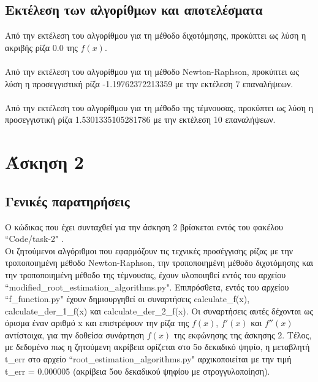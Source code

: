 \documentclass[a4paper,11pt]{article}
\newcommand{\lt}{\latintext}
\begin{document}
\subsection*{Εκτέλεση των αλγορίθμων και αποτελέσματα}
Από την εκτέλεση του αλγορίθμου για τη μέθοδο διχοτόμησης, προκύπτει ως λύση η ακριβής ρίζα 0.0 της {$f(x)$}.\\
\\Από την εκτέλεση του αλγορίθμου για τη μέθοδο {\lt Newton-Raphson}, προκύπτει ως λύση η προσεγγιστική ρίζα -1.19762372213359 με την εκτέλεση 7 επαναλήψεων.\\
\\Από την εκτέλεση του αλγορίθμου για τη μέθοδο της τέμνουσας, προκύπτει ως λύση η προσεγγιστική ρίζα 1.5301335105281786 με την εκτέλεση 10 επαναλήψεων.

\section*{Άσκηση 2}
\subsection*{Γενικές παρατηρήσεις}
Ο κώδικας που έχει συνταχθεί για την άσκηση 2 βρίσκεται εντός του φακέλου {\lt ``Code/task-2" }.\\
Οι ζητούμενοι αλγόριθμοι που εφαρμόζουν τις τεχνικές προσέγγισης ρίζας με την τροποποιημένη μέθοδο {\lt Newton-Raphson}, την τροποποιημένη μέθοδο διχοτόμησης και την τροποποιημένη μέθοδο της τέμνουσας, έχουν 		υλοποιηθεί εντός του αρχείου {\lt ``modified\_root\_estimation\_algorithms.py"}.
Επιπρόσθετα, εντός του αρχείου {\lt ``f\_function.py"} έχουν δημιουργηθεί οι συναρτήσεις {\lt calculate\_f(x)}, {\lt calculate\_der\_1\_f(x)} και {\lt calculate\_der\_2\_f(x)}. Οι συναρτήσεις αυτές δέχονται ως όρισμα έναν
αριθμό {\lt x} και επιστρέφουν την ρίζα της {\lt $f(x)$}, {\lt $f'(x)$} και {\lt $f''(x)$} αντίστοιχα, για την δοθείσα συνάρτηση {\lt $f(x)$} της εκφώνησης της άσκησης 2.
Τέλος, με δεδομένο πως η ζητούμενη ακρίβεια ορίζεται στο 5ο δεκαδικό ψηφίο, η μεταβλητή {\lt t\_err}  στο αρχείο {\lt ``root\_estimation\_algorithms.py"} αρχικοποιείται με την τιμή {\lt t\_err} = 0.000005 (ακρίβεια 5ου 	δεκαδικού ψηφίου με στρογγυλοποίηση).
\end{document}
